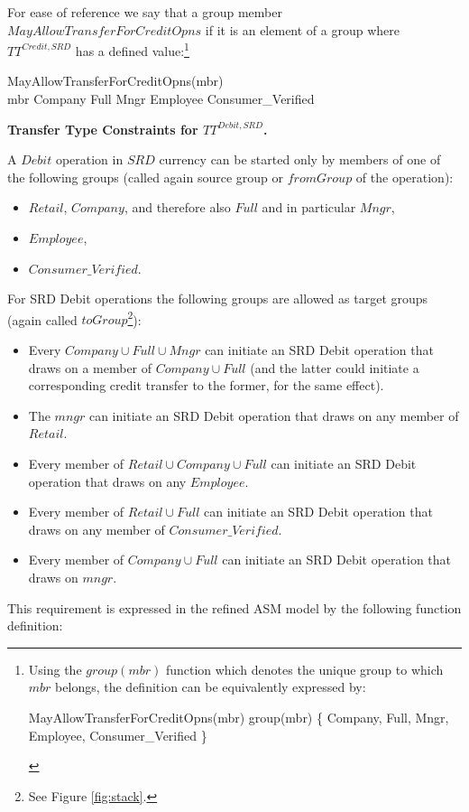 For ease of reference we say that a group member $MayAllowTransferForCreditOpns$ if it is an element of a group where $TT^{Credit,SRD}$ has a defined value:\footnote{Using the $group(mbr)$ function which denotes the unique group to which $mbr$ belongs, the definition can be equivalently expressed by:
  \begin{asm}
 MayAllowTransferForCreditOpns(mbr) \iff
    group(mbr) \in \{ Company, Full, Mngr, Employee, Consumer\_Verified \}
    \end{asm} }
 \begin{asm}
 MayAllowTransferForCreditOpns(mbr) \iff \\ \qquad\qquad\qquad\qquad\qquad\qquad\qquad
    mbr \in Company \cup Full \cup Mngr \cup Employee \cup Consumer\_Verified
    \end{asm}

{\bf Transfer Type Constraints for $TT^{Debit,SRD}$.} 


A $Debit$ operation in $SRD$ currency can be started only by members of one of the following groups (called again source group or $fromGroup$ of the operation):
\begin{itemize}
	\item $Retail$, $Company$, and therefore also $Full$ and in particular $Mngr$,
	\item $Employee$,
	\item $Consumer\_Verified$.  
\end{itemize}
For SRD Debit operations the following groups are allowed as target groups (again called $toGroup$\footnote{See Figure \ref{fig:stack}.}):
\begin{itemize}
	\item Every $Company \cup Full \cup Mngr$ can initiate an SRD Debit operation that draws on a member of $Company \cup Full$ (and the latter could initiate a corresponding credit transfer to the former, for the same effect).
	\item The $mngr$ can initiate an SRD Debit operation that draws on any member of $Retail$.
	\item Every member of $Retail \cup Company \cup Full$ can initiate an SRD Debit operation that draws on any $Employee$.
	\item Every member of $Retail \cup Full$ can initiate an SRD Debit operation that draws on any member of $Consumer\_Verified$.
	\item Every member of $Company \cup Full$ can initiate an SRD Debit operation that draws on $mngr$.
\end{itemize}
This requirement is expressed in the refined ASM model by the following function definition:

